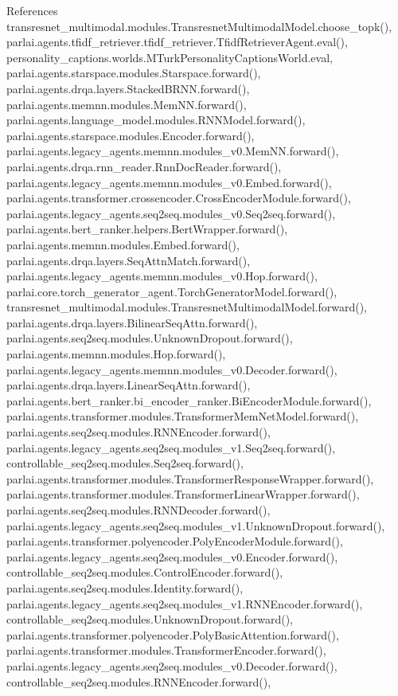 References transresnet\+\_\+multimodal.\+modules.\+Transresnet\+Multimodal\+Model.\+choose\+\_\+topk(), parlai.\+agents.\+tfidf\+\_\+retriever.\+tfidf\+\_\+retriever.\+Tfidf\+Retriever\+Agent.\+eval(), personality\+\_\+captions.\+worlds.\+M\+Turk\+Personality\+Captions\+World.\+eval, parlai.\+agents.\+starspace.\+modules.\+Starspace.\+forward(), parlai.\+agents.\+drqa.\+layers.\+Stacked\+B\+R\+N\+N.\+forward(), parlai.\+agents.\+memnn.\+modules.\+Mem\+N\+N.\+forward(), parlai.\+agents.\+language\+\_\+model.\+modules.\+R\+N\+N\+Model.\+forward(), parlai.\+agents.\+starspace.\+modules.\+Encoder.\+forward(), parlai.\+agents.\+legacy\+\_\+agents.\+memnn.\+modules\+\_\+v0.\+Mem\+N\+N.\+forward(), parlai.\+agents.\+drqa.\+rnn\+\_\+reader.\+Rnn\+Doc\+Reader.\+forward(), parlai.\+agents.\+legacy\+\_\+agents.\+memnn.\+modules\+\_\+v0.\+Embed.\+forward(), parlai.\+agents.\+transformer.\+crossencoder.\+Cross\+Encoder\+Module.\+forward(), parlai.\+agents.\+legacy\+\_\+agents.\+seq2seq.\+modules\+\_\+v0.\+Seq2seq.\+forward(), parlai.\+agents.\+bert\+\_\+ranker.\+helpers.\+Bert\+Wrapper.\+forward(), parlai.\+agents.\+memnn.\+modules.\+Embed.\+forward(), parlai.\+agents.\+drqa.\+layers.\+Seq\+Attn\+Match.\+forward(), parlai.\+agents.\+legacy\+\_\+agents.\+memnn.\+modules\+\_\+v0.\+Hop.\+forward(), parlai.\+core.\+torch\+\_\+generator\+\_\+agent.\+Torch\+Generator\+Model.\+forward(), transresnet\+\_\+multimodal.\+modules.\+Transresnet\+Multimodal\+Model.\+forward(), parlai.\+agents.\+drqa.\+layers.\+Bilinear\+Seq\+Attn.\+forward(), parlai.\+agents.\+seq2seq.\+modules.\+Unknown\+Dropout.\+forward(), parlai.\+agents.\+memnn.\+modules.\+Hop.\+forward(), parlai.\+agents.\+legacy\+\_\+agents.\+memnn.\+modules\+\_\+v0.\+Decoder.\+forward(), parlai.\+agents.\+drqa.\+layers.\+Linear\+Seq\+Attn.\+forward(), parlai.\+agents.\+bert\+\_\+ranker.\+bi\+\_\+encoder\+\_\+ranker.\+Bi\+Encoder\+Module.\+forward(), parlai.\+agents.\+transformer.\+modules.\+Transformer\+Mem\+Net\+Model.\+forward(), parlai.\+agents.\+seq2seq.\+modules.\+R\+N\+N\+Encoder.\+forward(), parlai.\+agents.\+legacy\+\_\+agents.\+seq2seq.\+modules\+\_\+v1.\+Seq2seq.\+forward(), controllable\+\_\+seq2seq.\+modules.\+Seq2seq.\+forward(), parlai.\+agents.\+transformer.\+modules.\+Transformer\+Response\+Wrapper.\+forward(), parlai.\+agents.\+transformer.\+modules.\+Transformer\+Linear\+Wrapper.\+forward(), parlai.\+agents.\+seq2seq.\+modules.\+R\+N\+N\+Decoder.\+forward(), parlai.\+agents.\+legacy\+\_\+agents.\+seq2seq.\+modules\+\_\+v1.\+Unknown\+Dropout.\+forward(), parlai.\+agents.\+transformer.\+polyencoder.\+Poly\+Encoder\+Module.\+forward(), parlai.\+agents.\+legacy\+\_\+agents.\+seq2seq.\+modules\+\_\+v0.\+Encoder.\+forward(), controllable\+\_\+seq2seq.\+modules.\+Control\+Encoder.\+forward(), parlai.\+agents.\+seq2seq.\+modules.\+Identity.\+forward(), parlai.\+agents.\+legacy\+\_\+agents.\+seq2seq.\+modules\+\_\+v1.\+R\+N\+N\+Encoder.\+forward(), controllable\+\_\+seq2seq.\+modules.\+Unknown\+Dropout.\+forward(), parlai.\+agents.\+transformer.\+polyencoder.\+Poly\+Basic\+Attention.\+forward(), parlai.\+agents.\+transformer.\+modules.\+Transformer\+Encoder.\+forward(), parlai.\+agents.\+legacy\+\_\+agents.\+seq2seq.\+modules\+\_\+v0.\+Decoder.\+forward(), controllable\+\_\+seq2seq.\+modules.\+R\+N\+N\+Encoder.\+forward(), 